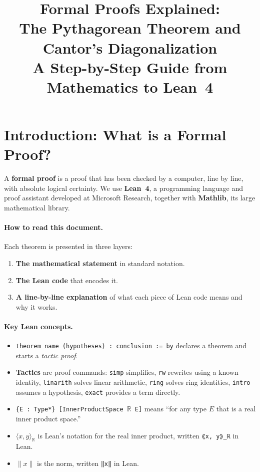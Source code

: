 \documentclass[11pt]{article}
\title{Formal Proofs Explained:\\
The Pythagorean Theorem and Cantor's Diagonalization\\
\large A Step-by-Step Guide from Mathematics to Lean~4}
\author{}
\date{}
\theoremstyle{plain}
\theoremstyle{definition}
\begin{document}
\maketitle
\tableofcontents
\newpage

\section{Introduction: What is a Formal Proof?}

A \textbf{formal proof} is a proof that has been checked by a computer, line by
line, with absolute logical certainty. We use \textbf{Lean~4}, a programming
language and proof assistant developed at Microsoft Research, together with
\textbf{Mathlib}, its large mathematical library.

\paragraph{How to read this document.}
Each theorem is presented in three layers:
\begin{enumerate}
  \item \textbf{The mathematical statement} in standard notation.
  \item \textbf{The Lean code} that encodes it.
  \item \textbf{A line-by-line explanation} of what each piece of Lean code means
        and why it works.
\end{enumerate}

\paragraph{Key Lean concepts.}
\begin{itemize}
  \item \texttt{theorem name (hypotheses) : conclusion := by} declares a theorem
        and starts a \emph{tactic proof}.
  \item \textbf{Tactics} are proof commands: \texttt{simp} simplifies,
        \texttt{rw} rewrites using a known identity, \texttt{linarith} solves
        linear arithmetic, \texttt{ring} solves ring identities,
        \texttt{intro} assumes a hypothesis, \texttt{exact} provides a term
        directly.
  \item \texttt{\{E : Type*\} [InnerProductSpace $\mathbb{R}$ E]} means
        ``for any type $E$ that is a real inner product space.''
  \item $\langle x, y \rangle_{\mathbb{R}}$ is Lean's notation for the real
        inner product, written \texttt{⟪x, y⟫\_ℝ} in Lean.
  \item $\|x\|$ is the norm, written \texttt{‖x‖} in Lean.
\end{itemize}
\end{document}

